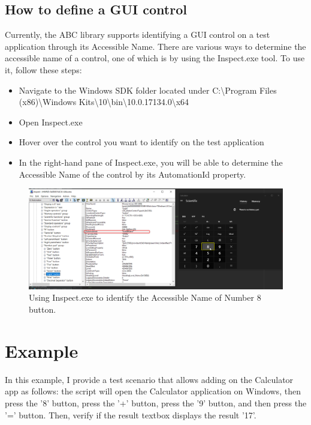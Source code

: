 \hypertarget{definition}{%
\subsection{\texorpdfstring{\textbf{How to define a GUI control}}{definition}}\label{definition}}
Currently, the ABC library supports identifying a GUI control on a test application through its Accessible Name. There are various ways to determine the accessible name of a control, one of which is by using the Inspect.exe tool. To use it, follow these steps:
\begin{itemize}
\item Navigate to the Windows SDK folder located under C:\textbackslash Program Files (x86)\textbackslash Windows Kits\textbackslash 10\textbackslash bin\textbackslash 10.0.17134.0\textbackslash x64
\item Open Inspect.exe
\item Hover over the control you want to identify on the test application
\item In the right-hand pane of Inspect.exe, you will be able to determine the Accessible Name of the control by its AutomationId property.
\end{itemize}

\begin{figure}[h]
  \centering
  \includegraphics[width=\linewidth]{pictures/capture_control.png}
  \caption{Using Inspect.exe to identify the Accessible Name of Number 8 button.}
\end{figure}

\hypertarget{example}{%
\section{Example}\label{example}}
In this example, I provide a test scenario that allows adding on the Calculator app as follows: the script will open the Calculator application on Windows, then press the '8' button, press the '+' button, press the '9' button, and then press the '=' button. 
Then, verify if the result textbox displays the result '17'.


